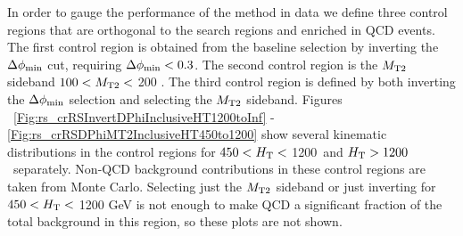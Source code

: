 In order to gauge the performance of the \rs method in data we define three control regions that are orthogonal to the search regions and enriched in QCD events.
The first control region is obtained from the baseline selection by inverting the $\Delta\phi_{\mathrm{min}}$ cut, requiring $\Delta\phi_{\mathrm{min}} < 0.3$. The second control region is the $M_{\mathrm{T2}}$
sideband $100< M_{\mathrm{T2}} <$ 200 \GeV. The third control region is defined by both inverting the $\Delta\phi_{\mathrm{min}}$ selection and selecting the $M_{\mathrm{T2}}$ sideband. Figures
~\ref{Fig:rs_crRSInvertDPhiInclusiveHT1200toInf} - \ref{Fig:rs_crRSDPhiMT2InclusiveHT450to1200} show several kinematic distributions in the control regions for
$450 <H_{\mathrm{T}}<$ 1200~\GeV and $H_{\mathrm{T}} > 1200$~\GeV separately. Non-QCD background contributions in these control regions are taken from Monte Carlo. Selecting just the $M_{\mathrm{T2}}$
sideband or just inverting \dpmin for $450<H_{\mathrm{T}}<$ 1200 GeV is not enough to make QCD a significant fraction of the total background in this \Ht region,
 so these plots are not shown.

